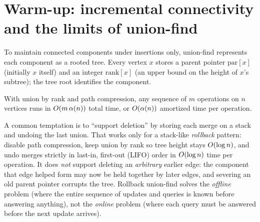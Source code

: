 \section{Warm-up: incremental connectivity and the limits of union-find}
\label{ch39:incremental}

To maintain connected components under insertions only, union-find represents each
component as a rooted tree. Every vertex $x$ stores a parent pointer $\mathrm{par}[x]$
(initially $x$ itself) and an integer $\mathrm{rank}[x]$ (an upper bound on the height
of $x$'s subtree); the tree root identifies the component.

\begin{algorithm}[H]
\caption{Incremental connectivity via union-find}
\label{ch39:alg-unionfind}
\end{algorithm}

With union by rank and path compression, any sequence of $m$ operations on $n$ vertices
runs in $O(m\,\alpha(n))$ total time, or $O(\alpha(n))$ amortized time per operation.

\begin{trapbox}
A common temptation is to ``support deletion'' by storing each merge on a stack and
undoing the last union. That works only for a stack-like \emph{rollback} pattern:
disable path compression, keep union by rank so tree height stays $O(\log n)$, and
undo merges strictly in last-in, first-out (LIFO) order in $O(\log n)$ time per
operation. It does \emph{not} support deleting an \emph{arbitrary} earlier edge: the
component that edge helped form may now be held together by later edges, and severing
an old parent pointer corrupts the tree. Rollback union-find solves the \emph{offline}
problem (where the entire sequence of updates and queries is known before answering
anything), not the \emph{online} problem (where each query must be answered before the
next update arrives).
\end{trapbox}

